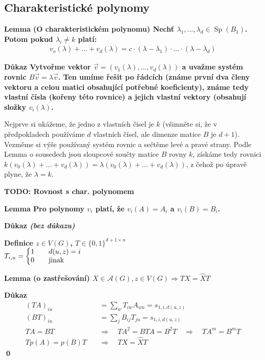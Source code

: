\documentclass[a4paper,12pt,titlepage]{article}
\newcommand{\lm}{\smallskip\noindent\bf Lemma\rm{} }
\newcommand{\dk}{\smallskip\noindent\bf Důkaz\rm{} }
\newcommand{\df}{\smallskip\noindent\bf Definice\rm{} }
\newcommand{\A}{\mathcal{A}}
\newcommand{\todo}[1]{\bf TODO: \rm#1}
\DeclareMathOperator{\Sp}{Sp}
\begin{document}
\subsection{Charakteristické polynomy}

\lm (O charakteristickém polynomu) Nechť $\lambda_1,\ldots,\lambda_d \in \Sp(B_1)$. Potom pokud $\lambda_i \neq k$ platí:
\begin{align}
	v_o(\lambda) + \ldots + v_d(\lambda) = c \cdot (\lambda - \lambda_1) \cdot \ldots \cdot (\lambda - \lambda_d)
\end{align}

\dk Vytvořme vektor $\vec{v} = (v_1(\lambda), \ldots, v_d(\lambda))$ a uvažme systém rovnic $B\vec{v} = \lambda \vec{v}$. Ten umíme řešit po řádcích (známe první dva členy vektoru a celou matici obsahující potřebné koeficienty), známe tedy vlastní čísla (kořeny této rovnice) a jejich vlastní vektory (obsahují složky $v_i(\lambda)$.

Nejprve si ukážeme, že jedno z vlastních čísel je $k$ (všimněte si, že v předpokladech používáme $d$ vlastních čísel, ale dimenze matice $B$ je $d+1$). Vezměme si výše používaný systém rovnic a sečtěme levé a pravé strany. Podle Lemma o sousedech jsou sloupcové součty matice $B$ rovny $k$, získáme tedy rovnici $k(v_0(\lambda) + \ldots + v_d(\lambda)) = \lambda (v_0(\lambda) + \ldots + v_d(\lambda))$, z čehož po úpravě plyne, že $\lambda = k$.

\todo{Rovnost s char. polynomem}

\lm Pro polynomy $v_i$ platí, že $v_i(A) = A_i$ a $v_i(B) = B_i$.

\dk {\it(bez důkazu)}


\df $z\in V(G)$, $T\in\{0,1\}^{d+1 \times n}$\\
\indent $T_{i,u} = \left\{\begin{matrix}
1\quad & d(u,z) = i\hfill \\
0\quad & \text{jinak}\hfill
\end{matrix}\right.$

\lm (o zastřešování) $X\in\A(G), z\in V(G) \Rightarrow TX = \widehat XT$

\dk 
\begin{align*}
(TA)_{iu} &= \sum_w T_{iw}A_{wu} = s_{1,i,d(u,z)} \\
(BT)_{iu} &= \sum_j B_{ij}T_{ju} = s_{1,i,d(u,z)} \\
TA = BT \quad&\Rightarrow\quad TA^2 = BTA = B^2T \quad\Rightarrow\quad TA^m = B^mT \\
Tp(A) = p(B)T \quad&\Rightarrow\quad TX = \widehat XT
\end{align*}
\qed
\end{document}
